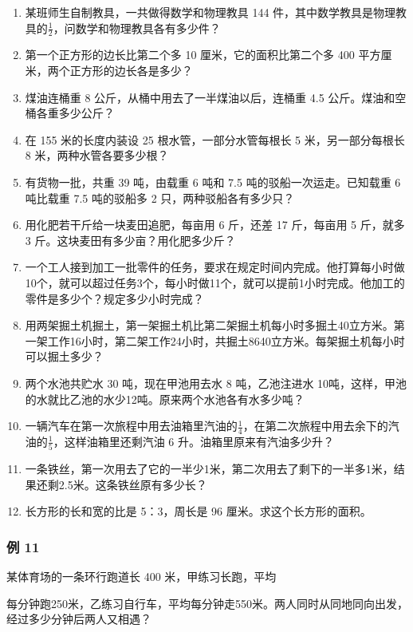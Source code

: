 \begin{enumerate}
\item
  某班师生自制教具，一共做得数学和物理教具 144
  件，其中数学教具是物理教具的\(\frac{1}{2}\)，问数学和物理教具各有多少件？
\item
  第一个正方形的边长比第二个多 10 厘米，它的面积比第二个多 400
  平方厘米，两个正方形的边长各是多少？
\item
  煤油连桶重 8 公斤，从桶中用去了一半煤油以后，连桶重 4.5
  公斤。煤油和空桶各重多少公斤？
\item
  在 155 米的长度内装设 25 根水管，一部分水管每根长 5 米，另一部分每根长
  8 米，两种水管各要多少根？
\item
  有货物一批，共重 39 吨，由载重 6 吨和 7.5 吨的驳船一次运走。已知载重 6
  吨比载重 7.5 吨的驳船多 2 只，两种驳船各有多少只？
\item
  用化肥若干斤给一块麦田追肥，每亩用 6 斤，还差 17 斤，每亩用 5 斤，就多
  3 斤。这块麦田有多少亩？用化肥多少斤？
\item
  一个工人接到加工一批零件的任务，要求在规定时间内完成。他打算每小时做10个，就可以超过任务3个，每小时做11个，就可以提前1小时完成。他加工的零件是多少个？规定多少小时完成？
\item
  用两架掘土机掘土，第一架掘土机比第二架掘土机每小时多掘土40立方米。第一架工作16小时，第二架工作24小时，共掘土8640立方米。每架掘土机每小时可以掘土多少？
\item
  两个水池共贮水 30 吨，现在甲池用去水 8 吨，乙池注进水
  10吨，这样，甲池的水就比乙池的水少12吨。原来两个水池各有水多少吨？
\item
  一辆汽车在第一次旅程中用去油箱里汽油的\(\frac{1}{4}\)，在第二次旅程中用去余下的汽油的\(\frac{1}{5}\)，这样油箱里还剩汽油
  6 升。油箱里原来有汽油多少升？
\item
  一条铁丝，第一次用去了它的一半少1米，第二次用去了剩下的一半多1米，结果还剩2.5米。这条铁丝原有多少长？
\item
  长方形的长和宽的比是 5：3，周长是 96 厘米。求这个长方形的面积。
\end{enumerate}

\subsubsection{例 11}

某体育场的一条环行跑道长 400 米，甲练习长跑，平均

每分钟跑250米，乙练习自行车，平均每分钟走550米。两人同时从同地同向出发，经过多少分钟后两人又相遇？

